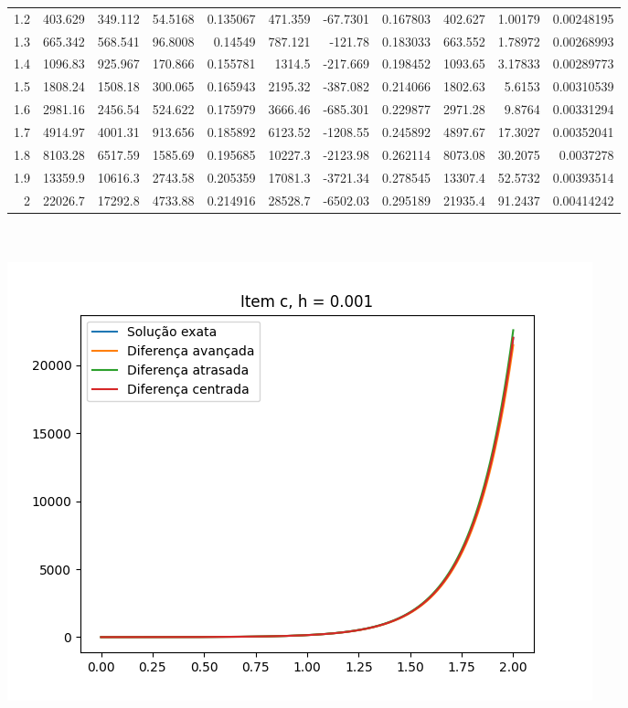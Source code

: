 {\begin{tabular}{rrrrrrrrrrr}
 1.2 &   403.629   &   349.112   &    54.5168    &     0.135067  &   471.359   &   -67.7301    &     0.167803  &   402.627   &   1.00179     &   0.00248195  \\
 1.3 &   665.342   &   568.541   &    96.8008    &     0.14549   &   787.121   &  -121.78      &     0.183033  &   663.552   &   1.78972     &   0.00268993  \\
 1.4 &  1096.83    &   925.967   &   170.866     &     0.155781  &  1314.5     &  -217.669     &     0.198452  &  1093.65    &   3.17833     &   0.00289773  \\
 1.5 &  1808.24    &  1508.18    &   300.065     &     0.165943  &  2195.32    &  -387.082     &     0.214066  &  1802.63    &   5.6153      &   0.00310539  \\
 1.6 &  2981.16    &  2456.54    &   524.622     &     0.175979  &  3666.46    &  -685.301     &     0.229877  &  2971.28    &   9.8764      &   0.00331294  \\
 1.7 &  4914.97    &  4001.31    &   913.656     &     0.185892  &  6123.52    & -1208.55      &     0.245892  &  4897.67    &  17.3027      &   0.00352041  \\
 1.8 &  8103.28    &  6517.59    &  1585.69      &     0.195685  & 10227.3     & -2123.98      &     0.262114  &  8073.08    &  30.2075      &   0.0037278   \\
 1.9 & 13359.9     & 10616.3     &  2743.58      &     0.205359  & 17081.3     & -3721.34      &     0.278545  & 13307.4     &  52.5732      &   0.00393514  \\
 2   & 22026.7     & 17292.8     &  4733.88      &     0.214916  & 28528.7     & -6502.03      &     0.295189  & 21935.4     &  91.2437      &   0.00414242  \\
\hline
\end{tabular}
}
        \\
        \\
        \includegraphics{c_h_0.001.png}
